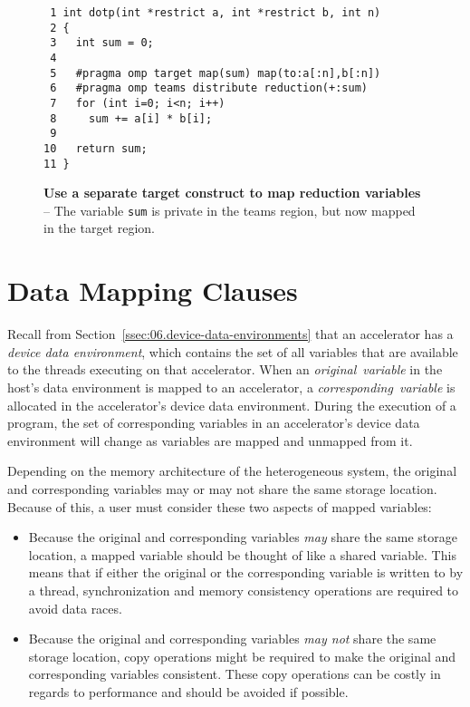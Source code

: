 \begin{figure*}[!tbh]
\begin{verbatim}
 1 int dotp(int *restrict a, int *restrict b, int n)
 2 {
 3   int sum = 0;
 4 
 5   #pragma omp target map(sum) map(to:a[:n],b[:n])
 6   #pragma omp teams distribute reduction(+:sum)
 7   for (int i=0; i<n; i++)
 8     sum += a[i] * b[i];
 9 
10   return sum;
11 }
\end{verbatim}
\caption{ \textbf {Use a separate target construct to map reduction variables} -- \small
          The variable \texttt{sum} is private in the teams region, but now mapped
          in the target region.
        }
\label{figure:chapter6-targetteams-reduction-v2}
\end{figure*}


\section{Data Mapping Clauses}
\label{sec:06.data-mapping-clauses}

Recall from Section~\ref{ssec:06.device-data-environments} that an accelerator has a
\emph{device data environment}, which contains the set of all variables that are
available to the threads executing on that accelerator.  When an 
\emph{original}~\emph{variable} in the host's data environment is mapped to an accelerator, a
\emph{corresponding}~\emph{variable} is allocated in the accelerator's device data
environment.  During the execution of a program, the set of corresponding
variables in an accelerator's device data environment will change as variables
are mapped and unmapped from it.

Depending on the memory architecture of the heterogeneous system, the original
and corresponding variables may or may not share the same storage location.
Because of this, a user must consider these two aspects of mapped
variables: \begin{itemize}

    \item Because the original and corresponding variables \emph{may} share the
    same storage location, a mapped variable should be thought of like a shared
    variable.  This means that if either the original or the corresponding
    variable is written to by a thread, synchronization and memory consistency
    operations are required to avoid data races.

    \item Because the original and corresponding variables \emph{may not} share
    the same storage location, copy operations might be required to make the
    original and corresponding variables consistent.  These copy operations can
    be costly in regards to performance and should be
    avoided if possible.

\end{itemize}

